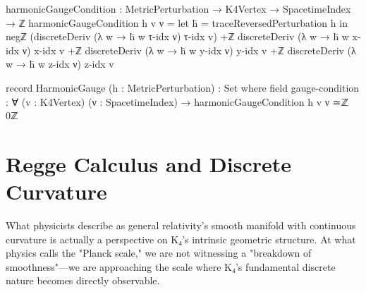 \documentclass[11pt,a4paper]{book}
\begin{document}
\begin{code}
harmonicGaugeCondition : MetricPerturbation → K4Vertex → SpacetimeIndex → ℤ
harmonicGaugeCondition h v ν = 
  let h̄ = traceReversedPerturbation h
  in negℤ (discreteDeriv (λ w → h̄ w τ-idx ν) τ-idx v) +ℤ
     discreteDeriv (λ w → h̄ w x-idx ν) x-idx v +ℤ
     discreteDeriv (λ w → h̄ w y-idx ν) y-idx v +ℤ
     discreteDeriv (λ w → h̄ w z-idx ν) z-idx v

record HarmonicGauge (h : MetricPerturbation) : Set where
  field
    gauge-condition : ∀ (v : K4Vertex) (ν : SpacetimeIndex) →
                      harmonicGaugeCondition h v ν ≃ℤ 0ℤ
\end{code}

\chapter{Regge Calculus and Discrete Curvature}

What physicists describe as general relativity's smooth manifold with continuous curvature is actually a perspective on K₄'s intrinsic geometric structure. At what physics calls the "Planck scale," we are not witnessing a "breakdown of smoothness"—we are approaching the scale where K₄'s fundamental discrete nature becomes directly observable.
\end{document}
